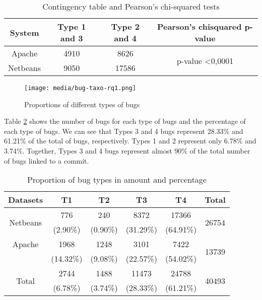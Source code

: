\begin{table}[h!]
\centering
\begin{tabular}{c|c|c|c}
{System} & {Type 1 and 3} & {Type 2 and 4} & {Pearson’s chisquared p-value}        \\  \hline \hline
Apache       & 4910               & 8626               & \multirow{2}{*}{p-value \textless 0,0001} \\ \cline{1-3}
Netbeans     & 9050               & 17586              & \\ \hline \hline
\end{tabular}
\caption{Contingency table and Pearson's chi-squared tests\label{tab:bug-taxo-rq1}}
\end{table}

\begin{figure}[h!]
  \centering
    \texttt{[image: media/bug-taxo-rq1.png]}
    \caption{Proportions of different types of bugs
    \label{fig:bug-taxo-rq1}}
\end{figure}

Table \ref{tab:bug-taxo-rq1-prop} shows the number of bugs for each type of bugs
and the percentage of each type of bugs. We can see that
Types 3 and 4 bugs represent 28.33\% and 61.21\% of the total
of bugs, respectively. Types 1 and 2 represent only 6.78\% and
3.74\%. Together, Types 3 and 4 bugs represent almost 90\%
of the total number of bugs linked to a commit.

\begin{table}[h!]
\centering

\begin{tabular}{c|c|c|c|c|c}
Datasets                  & T1        & T2       & T3        & T4        & Total                  \\ \hline \hline
\multirow{2}{*}{Netbeans} & 776       & 240      & 8372      & 17366     & \multirow{2}{*}{26754} \\
                          & (2.90\%)  & (0.90\%) & (31.29\%) & (64.91\%) &                        \\ \hline
Apache                    & 1968      & 1248     & 3101      & 7422      & \multirow{2}{*}{13739} \\
                          & (14.32\%) & (9.08\%) & (22.57\%) & (54.02\%) &                        \\ \hline
\multirow{2}{*}{Total}    & 2744      & 1488     & 11473     & 24788     & \multirow{2}{*}{40493} \\
                          & (6.78\%)  & (3.74\%) & (28.33\%) & (61.21\%) & \\ \hline \hline
\end{tabular}
\caption{Proportion of bug types in amount and percentage}
\label{tab:bug-taxo-rq1-prop}
\end{table}


